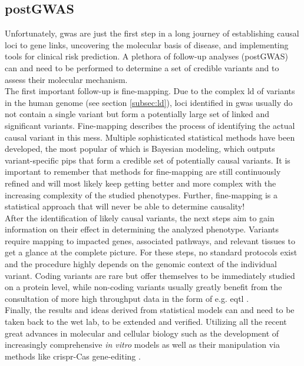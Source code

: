     \subsection{postGWAS}
    \label{subsec:gwas_limit}
    Unfortunately, \ac{gwas} are just the first step in a long journey of establishing causal loci to gene links, uncovering the molecular basis of disease, and implementing tools for clinical risk prediction. A plethora of follow-up analyses (postGWAS) can and need to be performed to determine a set of credible variants and to assess their molecular mechanism.\\
    The first important follow-up is fine-mapping. Due to the complex \ac{ld} of variants in the human genome (see section \ref{subsec:ld}), loci identified in \ac{gwas} usually do not contain a single variant but form a potentially large set of linked and significant variants. Fine-mapping describes the process of identifying the actual causal variant in this mess. Multiple sophisticated statistical methods have been developed, the most popular of which is Bayesian modeling, which outputs variant-specific \acp{pip} that form a credible set of potentially causal variants. It is important to remember that methods for fine-mapping are still continuously refined and will most likely keep getting better and more complex with the increasing complexity of the studied phenotypes. Further, fine-mapping is a statistical approach that will never be able to determine causality! \cite{schaidGenomewideAssociationsCandidate2018, uffelmannGenomewideAssociationStudies2021}\\
    After the identification of likely causal variants, the next steps aim to gain information on their effect in determining the analyzed phenotype. Variants require mapping to impacted genes, associated pathways, and relevant tissues to get a glance at the complete picture. For these steps, no standard protocols exist and the procedure highly depends on the genomic context of the individual variant. Coding variants are rare but offer themselves to be immediately studied on a protein level, while non-coding variants usually greatly benefit from the consultation of more high throughput data in the form of e.g. \ac{eqtl} \cite{uffelmannGenomewideAssociationStudies2021}.\\
    Finally, the results and ideas derived from statistical models can and need to be taken back to the wet lab, to be extended and verified. Utilizing all the recent great advances in molecular and cellular biology such as the development of increasingly comprehensive \textit{in vitro} models as well as their manipulation via methods like \ac{crispr}-Cas gene-editing \cite{lichouFunctionalStudiesGWAS2020}.


